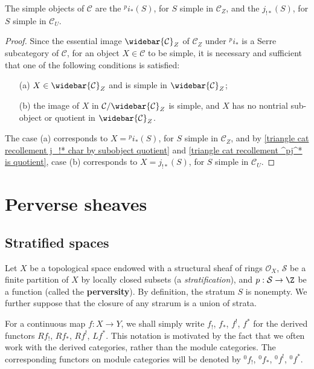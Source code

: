 \begin{proposition}\label{triangle cat recollement simple object of heart char}
The simple objects of $\mathcal{C}$ are the ${^pi_*}(S)$, for $S$ simple in $\mathcal{C}_Z$, and the $j_{!*}(S)$, for $S$ simple in $\mathcal{C}_U$.
\end{proposition}
\begin{proof}
Since the essential image $\widebar{\mathcal{C}}_Z$ of $\mathcal{C}_Z$ under ${^pi_*}$ is a Serre subcategory of $\mathcal{C}$, for an object $X\in\mathcal{C}$ to be simple, it is necessary and sufficient that one of the following conditions is satisfied:
\begin{enumerate}
    \item[(a)] $X\in\widebar{\mathcal{C}}_Z$ and is simple in $\widebar{\mathcal{C}}_Z$;
    \item[(b)] the image of $X$ in $\mathcal{C}/\widebar{\mathcal{C}}_Z$ is simple, and $X$ has no nontrial sub-object or quotient in $\widebar{\mathcal{C}}_Z$.
\end{enumerate}
The case (a) corresponds to $X={^pi_*}(S)$, for $S$ simple in $\mathcal{C}_Z$, and by \cref{triangle cat recollement j_!* char by subobject quotient} and \cref{triangle cat recollement ^pj^* is quotient}, case (b) corresponds to $X=j_{!*}(S)$, for $S$ simple in $\mathcal{C}_U$.
\end{proof}

\section{Perverse sheaves}
\subsection{Stratified spaces}\label{triangle cat perverse sheaf stratified space subsection}
Let $X$ be a topological space endowed with a structural sheaf of rings $\mathscr{O}_X$, $\mathcal{S}$ be a finite partition of $X$ by locally closed subsets (a \textit{stratification}), and $p:\mathcal{S}\to\Z$ be a function (called the \textbf{perversity}). By definition, the stratum $S$ is nonempty. We further suppose that the closure of any strarum is a union of strata.\par
For a continuous map $f:X\to Y$, we shall simply write $f_!$, $f_*$, $f^!$, $f^*$ for the derived functors $Rf_!$, $Rf_*$, $Rf^!$, $Lf^*$. This notation is motivated by the fact that we often work with the derived categories, rather than the module categories. The corresponding functors on module categories will be denoted by ${^0f_!}$, ${^0f_*}$, ${^0f^!}$, ${^0f^*}$.

